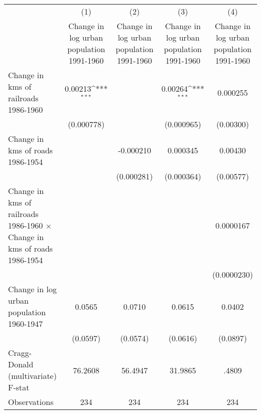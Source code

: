 {
\def\sym#1{\ifmmode^{#1}\else\(^{#1}\)\fi}
\begin{tabular}{l*{4}{c}}
\hline\hline
                &\multicolumn{1}{c}{(1)}&\multicolumn{1}{c}{(2)}&\multicolumn{1}{c}{(3)}&\multicolumn{1}{c}{(4)}\\
                &\multicolumn{1}{c}{Change in log urban population 1991-1960}&\multicolumn{1}{c}{Change in log urban population 1991-1960}&\multicolumn{1}{c}{Change in log urban population 1991-1960}&\multicolumn{1}{c}{Change in log urban population 1991-1960}\\
\hline
Change in kms of railroads 1986-1960&  0.00213\sym{***}&                  &  0.00264\sym{***}& 0.000255         \\
                &(0.000778)         &                  &(0.000965)         &(0.00300)         \\
[1em]
Change in kms of roads 1986-1954&                  &-0.000210         & 0.000345         &  0.00430         \\
                &                  &(0.000281)         &(0.000364)         &(0.00577)         \\
[1em]
Change in kms of railroads 1986-1960 $\times$ Change in kms of roads 1986-1954&                  &                  &                  &0.0000167         \\
                &                  &                  &                  &(0.0000230)         \\
[1em]
Change in log urban population 1960-1947&   0.0565         &   0.0710         &   0.0615         &   0.0402         \\
                & (0.0597)         & (0.0574)         & (0.0616)         & (0.0897)         \\
\hline
Cragg-Donald (multivariate) F-stat&  76.2608         &  56.4947         &  31.9865         &    .4809         \\
Observations    &      234         &      234         &      234         &      234         \\
\hline\hline
\end{tabular}
}
